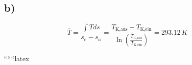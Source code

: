 

\subsection*{b)}

\[
\overline{T} = \frac{\int T ds}{s_{e} - s_{a}} = \frac{T_{\text{K,aus}} - T_{\text{K,ein}}}{\ln \left( \frac{T_{\text{K,aus}}}{T_{\text{K,ein}}} \right)} = 293.12 \, K
\]

``````latex